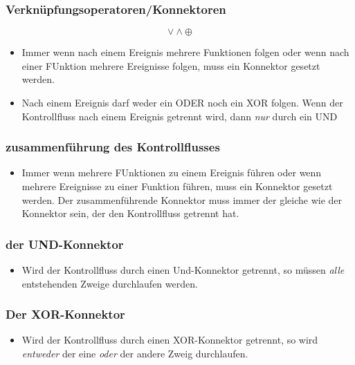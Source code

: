 \documentclass[a4paper, 12pt]{report}
\begin{document}
\begin{multicols}{2}
\subsubsection{Verknüpfungsoperatoren/Konnektoren}

\begin{equation}
	\lor \land \oplus
\end{equation}

\begin{itemize}
	\item Immer wenn nach einem Ereignis mehrere Funktionen folgen oder wenn 
		nach einer FUnktion mehrere Ereignisse folgen, muss ein 
		Konnektor gesetzt werden. 
	\item Nach einem Ereignis darf weder ein ODER noch ein XOR folgen. Wenn
		der Kontrollfluss nach einem Ereignis getrennt wird, dann 
		\emph{nur} durch ein UND
\end{itemize}

\subsubsection{zusammenführung des Kontrollflusses}

\begin{itemize}
	\item Immer wenn mehrere FUnktionen zu einem Ereignis führen oder wenn 
		mehrere Ereignisse zu einer Funktion führen, muss ein Konnektor 
		gesetzt werden. Der zusammenführende Konnektor muss immer der 
		gleiche wie der Konnektor sein, der den Kontrollfluss getrennt 
		hat.
\end{itemize}

\subsubsection{der UND-Konnektor}

\begin{itemize}
	\item Wird der Kontrollfluss durch einen Und-Konnektor getrennt, so 
		müssen \emph{alle} entstehenden Zweige durchlaufen werden. 
\end{itemize}

\subsubsection{Der XOR-Konnektor}

\begin{itemize}
	\item Wird der Kontrollfluss durch einen XOR-Konnektor getrennt, so wird
		\emph{entweder} der eine \emph{oder} der andere Zweig 
		durchlaufen. 
\end{itemize}


\end{multicols}
\end{document}
